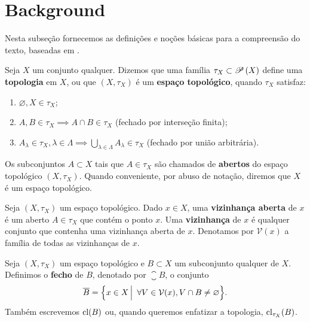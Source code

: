 \section{Background}
 
 Nesta subseção fornecemos as definições e noções básicas
 para a compreensão do texto, baseadas em \cite{caldas}.
 
 \begin{definition}
 Seja
 $X$
 um conjunto qualquer.
 Dizemos que uma família
 $\tau_X \subset {{\mathscr{P}}\left(X\right)}$
 define uma \textbf{topologia} em
 $X$,
 ou que
 $(X, \tau_X)$
 é um \textbf{espaço topológico}, quando
 $\tau_X$
 satisfaz:
 \begin{enumerate}
     \item $\varnothing, X \in \tau_X$;
     \item $A, B \in \tau_X \implies A \cap B \in \tau_X$ (fechado por interseção finita);
     \item $A_{\lambda} \in \tau_X, \lambda \in \Lambda 
     \implies \displaystyle{ \bigcup_{\lambda \in \Lambda} A_{\lambda} \in \tau_X }$ (fechado por união arbitrária).
 \end{enumerate}
 Os subconjuntos
 $A \subset X$
 tais que
 $A \in \tau_X$
 são chamados de \textbf{abertos} do espaço topológico
 $(X, \tau_X)$.
 Quando conveniente, por abuso de notação, diremos que
 $X$
 é um espaço topológico.
 \end{definition}
 
 \begin{definition}[Vizinhanças]
 Seja
 $(X, \tau_X)$
 um espaço topológico.
 Dado
 $x \in X$,
 uma \textbf{vizinhança aberta} de
 $x$
 é um aberto 
 $A \in \tau_X$
 que contém o ponto 
 $x$.
 Uma \textbf{vizinhança} de
 $x$
 é qualquer conjunto que contenha uma 
 vizinhança aberta de
 $x$.
 Denotamos por
 $\mathcal{V}(x)$
 a família de todas as vizinhanças de
 $x$.
 \end{definition}
 
 \begin{definition}[Fecho]
 Seja
 $(X, \tau_X)$
 um espaço topológico e
 $B \subset X$
 um subconjunto qualquer de
 $X$.
 Definimos o \textbf{fecho} de
 $B$, 
 denotado por
 $\closure B$,
 o conjunto
 \begin{equation*}
     \closure B
     =
     \setsuchthat{ x \in X }{ \forall V \in \mathcal{V}(x), V \cap B \neq \varnothing }.
 \end{equation*}
 Também escrevemos
 $\operatorname{cl} (B)$
 ou, quando queremos enfatizar a topologia,
 $\operatorname{cl}_{\tau_X}(B)$.
 \end{definition}
 
